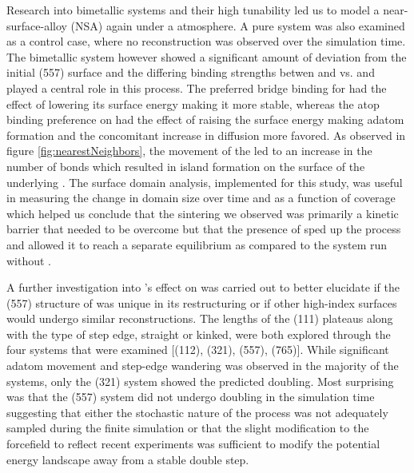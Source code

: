 Research into bimetallic systems and their high tunability led us to model a
 near-surface-alloy (NSA) again under a  atmosphere. A
pure  system was also examined as a control case, where no
reconstruction was observed over the simulation time. The bimetallic system
however showed a significant amount of deviation from the initial (557) surface
and the differing binding strengths betwen  and  vs.  and
 played a central role in this process. The preferred bridge binding for
 had the effect of lowering its surface energy making it more
stable, whereas the atop binding preference on  had the effect of
raising the surface energy making adatom formation and the concomitant increase
in diffusion more favored. As observed in figure \ref{fig:nearestNeighbors}, the
movement of the  led to an increase in the number of 
bonds which resulted in island formation on the surface of the underlying
. The surface domain analysis, implemented for this study, was useful in
measuring the change in domain size over time and as a function of 
coverage which helped us conclude that the sintering we observed was primarily
a kinetic barrier that needed to be overcome but that the presence of 
sped up the process and allowed it to reach a separate equilibrium as compared
to the system run without .

A further investigation into 's effect on  was carried out to
better elucidate if the (557) structure of  was unique in its
restructuring or if other high-index surfaces would undergo similar
reconstructions. The lengths of the (111) plateaus along with the type of step
edge, straight or kinked, were both explored through the four systems that were
examined [(112), (321), (557), (765)]. While significant adatom movement and
step-edge wandering was observed in the majority of the systems, only the (321)
system showed the predicted doubling. Most surprising was that the (557) system
did not undergo doubling in the simulation time suggesting that either the
stochastic nature of the process was not adequately sampled during the finite
simulation or that the slight modification to the  forcefield
to reflect recent experiments\citep{Deshlahra:2012aa} was sufficient to modify
the potential energy landscape away from a stable double step.

%



